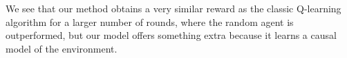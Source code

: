 \documentclass[11pt]{article}
\theoremstyle{plain}
\begin{document}
%
%
%
%
%
%
%

We see that our method obtains a very similar reward as the classic Q-learning algorithm for a larger number of rounds, where the random agent is outperformed, but our model offers something extra because it learns a causal model of the environment. 

\newpage


\end{document}
